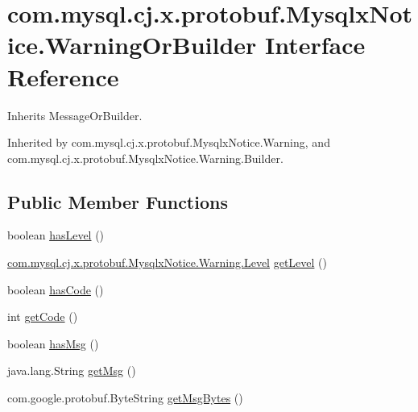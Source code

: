 \hypertarget{interfacecom_1_1mysql_1_1cj_1_1x_1_1protobuf_1_1_mysqlx_notice_1_1_warning_or_builder}{}\section{com.\+mysql.\+cj.\+x.\+protobuf.\+Mysqlx\+Notice.\+Warning\+Or\+Builder Interface Reference}
\label{interfacecom_1_1mysql_1_1cj_1_1x_1_1protobuf_1_1_mysqlx_notice_1_1_warning_or_builder}


Inherits Message\+Or\+Builder.



Inherited by com.\+mysql.\+cj.\+x.\+protobuf.\+Mysqlx\+Notice.\+Warning, and com.\+mysql.\+cj.\+x.\+protobuf.\+Mysqlx\+Notice.\+Warning.\+Builder.

\subsection*{Public Member Functions}
\begin{DoxyCompactItemize}
\item 
boolean \mbox{\hyperlink{interfacecom_1_1mysql_1_1cj_1_1x_1_1protobuf_1_1_mysqlx_notice_1_1_warning_or_builder_a9fe7f4c6a917fdf89d0cf589aa20b9ab}{has\+Level}} ()
\item 
\mbox{\hyperlink{enumcom_1_1mysql_1_1cj_1_1x_1_1protobuf_1_1_mysqlx_notice_1_1_warning_1_1_level}{com.\+mysql.\+cj.\+x.\+protobuf.\+Mysqlx\+Notice.\+Warning.\+Level}} \mbox{\hyperlink{interfacecom_1_1mysql_1_1cj_1_1x_1_1protobuf_1_1_mysqlx_notice_1_1_warning_or_builder_a01c6919aa5afa32d4bcba4407b783a7e}{get\+Level}} ()
\item 
boolean \mbox{\hyperlink{interfacecom_1_1mysql_1_1cj_1_1x_1_1protobuf_1_1_mysqlx_notice_1_1_warning_or_builder_ad4c8af52bb5bbe9d79a898ea5fc14bab}{has\+Code}} ()
\item 
int \mbox{\hyperlink{interfacecom_1_1mysql_1_1cj_1_1x_1_1protobuf_1_1_mysqlx_notice_1_1_warning_or_builder_a80bf4dbca6d4308c375bd55ded86b996}{get\+Code}} ()
\item 
boolean \mbox{\hyperlink{interfacecom_1_1mysql_1_1cj_1_1x_1_1protobuf_1_1_mysqlx_notice_1_1_warning_or_builder_ad7d713a312766811f453852209d1d466}{has\+Msg}} ()
\item 
java.\+lang.\+String \mbox{\hyperlink{interfacecom_1_1mysql_1_1cj_1_1x_1_1protobuf_1_1_mysqlx_notice_1_1_warning_or_builder_a1a3e14937c8099670e3fc5a4d8444be3}{get\+Msg}} ()
\item 
com.\+google.\+protobuf.\+Byte\+String \mbox{\hyperlink{interfacecom_1_1mysql_1_1cj_1_1x_1_1protobuf_1_1_mysqlx_notice_1_1_warning_or_builder_a8eabd62afff4dd1b4d5834b32643e234}{get\+Msg\+Bytes}} ()
\end{DoxyCompactItemize}


